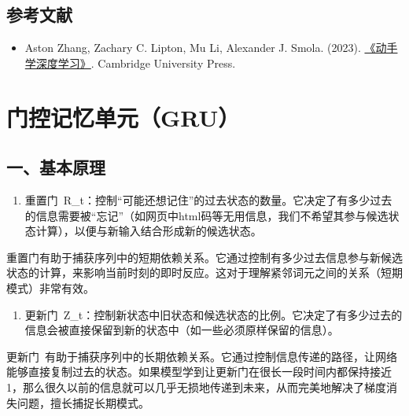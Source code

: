 \hypertarget{ux53c2ux8003ux6587ux732e-17}{%
\subsection{参考文献}\label{ux53c2ux8003ux6587ux732e-17}}

\begin{itemize}
\tightlist
\item
  Aston Zhang, Zachary C. Lipton, Mu Li, Alexander J. Smola. (2023). \href{https://zh.d2l.ai/}{《动手学深度学习》}. Cambridge University Press.
\end{itemize}

\clearpage

\hypertarget{ux95e8ux63a7ux8bb0ux5fc6ux5355ux5143gru}{%
\section{门控记忆单元（GRU）}\label{ux95e8ux63a7ux8bb0ux5fc6ux5355ux5143gru}}

\hypertarget{ux4e00ux57faux672cux539fux7406}{%
\subsection{一、基本原理}\label{ux4e00ux57faux672cux539fux7406}}

\begin{enumerate}
\def\labelenumi{\arabic{enumi}.}
\tightlist
\item
  重置门~R\_t：控制``可能还想记住''的过去状态的数量。它决定了有多少过去的信息需要被``忘记''（如网页中html码等无用信息，我们不希望其参与候选状态计算），以便与新输入结合形成新的候选状态。
\end{enumerate}

重置门有助于捕获序列中的短期依赖关系。它通过控制有多少过去信息参与新候选状态的计算，来影响当前时刻的即时反应。这对于理解紧邻词元之间的关系（短期模式）非常有效。

\begin{enumerate}
\def\labelenumi{\arabic{enumi}.}
\setcounter{enumi}{1}
\tightlist
\item
  更新门~Z\_t：控制新状态中旧状态和候选状态的比例。它决定了有多少过去的信息会被直接保留到新的状态中（如一些必须原样保留的信息）。
\end{enumerate}

更新门~有助于捕获序列中的长期依赖关系。它通过控制信息传递的路径，让网络能够直接复制过去的状态。如果模型学到让更新门在很长一段时间内都保持接近1，那么很久以前的信息就可以几乎无损地传递到未来，从而完美地解决了梯度消失问题，擅长捕捉长期模式。

